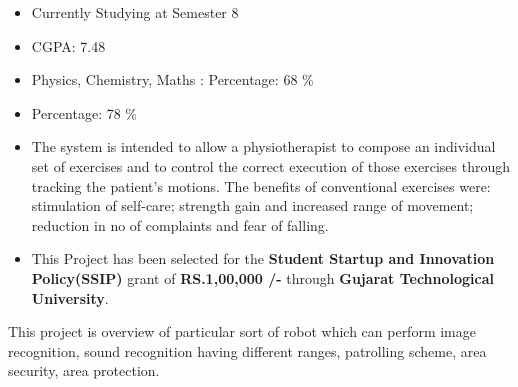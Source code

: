 \documentclass[10pt,a4paper]{altacv}
\begin{document}
\begin{itemize}
    \item Currently Studying at Semester 8
    \item CGPA: 7.48
\end{itemize}
\divider
\divider
{}
\begin{itemize}
    
    \item Physics, Chemistry, Maths : Percentage: 68 \%
\end{itemize}
\divider
\divider
{}
\begin{itemize}
    \item Percentage: 78 \%
\end{itemize}
\begin{itemize}
\item The system is intended to allow a physiotherapist to compose an individual set of exercises and to control the correct execution of those exercises through tracking the patient's motions. The benefits of conventional exercises were: stimulation of self-care; strength gain and increased range of movement; reduction in no of complaints and fear of falling.
\item This Project has been selected for the \textbf{Student Startup and Innovation Policy(SSIP)} grant of \textbf{RS.1,00,000 /-} through \textbf{Gujarat Technological University}. 
\end{itemize}

\divider

This project is overview of particular sort of robot which can perform image recognition, sound recognition having different ranges, patrolling scheme, area security, area protection.
\end{document}
